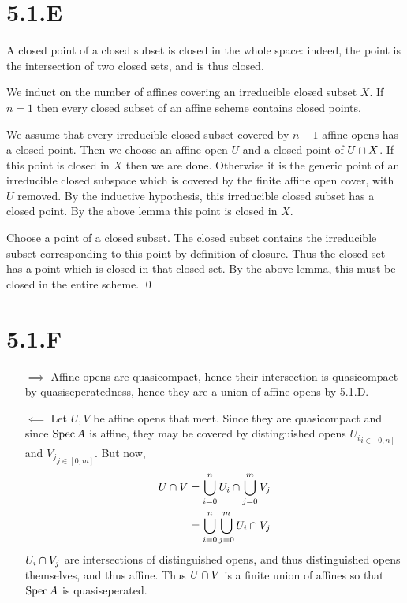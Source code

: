 \documentclass{article}
\begin{document}
\section{5.1.E}
A closed point of a closed subset is closed in the whole space: indeed, the
point is the intersection of two closed sets, and is thus closed.

We induct on the number of affines covering an irreducible closed subset
$X$. If $n=1$ then every closed subset of
an affine scheme contains closed points.

We assume that every irreducible closed subset covered by
$n-1$ affine opens has a closed point. Then we choose an
affine open $U$ and a closed point of
$U \cap X$. If this point is closed in $X$
then we are done. Otherwise it is the generic point of an irreducible closed
subspace which is covered by the finite affine open cover, with
$U$ removed. By the inductive hypothesis, this irreducible
closed subset has a closed point. By the above lemma this point is closed in
$X$.

Choose a point of a closed subset. The closed subset contains the irreducible
subset corresponding to this point by definition of closure. Thus the closed
set has a point which is closed in that closed set. By the above lemma, this
must be closed in the entire scheme. \qed

\section{5.1.F}
\begin{enumerate}[a.]
    \item [$\implies$] Affine opens are quasicompact, hence their
          intersection is quasicompact by quasiseperatedness, hence they are a union of
          affine opens by 5.1.D.
    \item [$\impliedby$] Let $U, V$ be affine opens that meet.
          Since they are quasicompact and since $\operatorname{Spec} A$ is affine, they
          may be covered by distinguished opens ${U_i}_{i \in [0,n]}$ and
          ${V_j}_{j \in [0,m]}$. But now,
          \begin{align*}
              U \cap V & = \bigcup_{i=0}^n U_i \cap \bigcup_{j=0}^m V_j \\
                             & = \bigcup_{i=0}^n \bigcup_{j=0}^m U_i \cap V_j
          \end{align*}
          $U_i \cap V_j$ are intersections of distinguished opens, and thus
          distinguished opens themselves, and thus affine. Thus $U \cap V$ is
          a finite union of affines so that $\operatorname{Spec} A$ is quasiseperated.
\end{enumerate}
\end{document}

